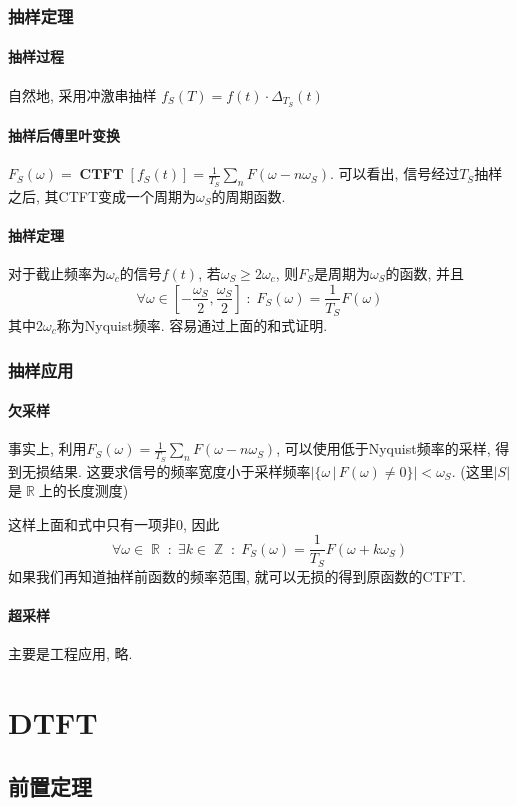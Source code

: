 \documentclass{ctexart}
\DeclareMathOperator{\CTFT}{\mathbf{CTFT}}
\DeclareMathOperator{\Rset}{\mathbb{R}}
\DeclareMathOperator{\Zset}{\mathbb{Z}}
\begin{document}
\subsubsection{抽样定理}
\paragraph{抽样过程} 自然地, 采用冲激串抽样 $f_S(T) = f(t)\cdot \Delta_{T_S}(t)$
\paragraph{抽样后傅里叶变换} $F_S(\omega) = \CTFT[ f_S(t) ] = \frac{1}{T_S} \sum_n F(\omega - n \omega_S)$.
    可以看出, 信号经过$T_S$抽样之后, 其CTFT变成一个周期为$\omega_S$的周期函数.
\paragraph{抽样定理} 对于截止频率为$\omega_c$的信号$f(t)$, 若$\omega_S \ge 2 \omega_c$, 则$F_S$是周期为$\omega_S$的函数,
    并且\[\forall \omega \in [-\frac{\omega_S}{2}, \frac{\omega_S}{2}]\;:\;F_S(\omega) = \frac{1}{T_S} F(\omega)\]
    其中$2\omega_c$称为Nyquist频率.
    容易通过上面的和式证明.
\subsubsection{抽样应用}
\paragraph{欠采样} 事实上, 利用$F_S(\omega) = \frac{1}{T_S} \sum_n F(\omega - n\omega_S)$,
    可以使用低于Nyquist频率的采样, 得到无损结果.
    这要求信号的频率宽度小于采样频率$|\{\omega\,|\,F(\omega) \neq 0\}| < \omega_S$.
    (这里$|S|$是$\Rset$上的长度测度)\par
    这样上面和式中只有一项非0, 因此
        \[\forall \omega\in\Rset\;:\;\exists k \in \Zset\;:\;F_S(\omega) = \frac{1}{T_S} F(\omega + k \omega_S)\]
    如果我们再知道抽样前函数的频率范围, 就可以无损的得到原函数的CTFT.
\paragraph{超采样} 主要是工程应用, 略.

\clearpage


\section{DTFT}
\subsection{前置定理}
\end{document}
